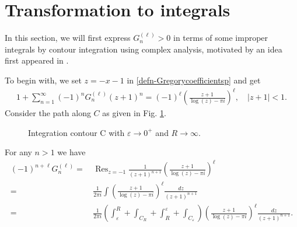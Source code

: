\documentclass[11pt]{article}
\newcommand\eps{{\varepsilon}}
\DeclareMathOperator{\Res}{Res}
\theoremstyle{plain}
\theoremstyle{definition}
\begin{document}
\section{Transformation to integrals}\label{sec:contour}
In this section, we will first express $G_n^{(\ell)}>0$ in terms of some improper integrals by contour integration using complex analysis, motivated by an idea first appeared in \cite{Schr1880}.

To begin with, we set $z=-x-1$ in \eqref{defn-Gregorycoefficientsp} and get
\begin{align*}
1+\sum_{n=1}^\infty (-1)^n G_n^{(\ell)}(z+1)^n=(-1)^\ell \left(\frac{z+1}{\log(z)-\pi i}\right)^\ell, \quad |z+1|<1.
\end{align*}
Consider the path along $C$ as given in Fig. \ref{fig:C}.
\begin{figure}[h]
\begin{center}
\end{center}
\caption{Integration contour C with $\eps\to 0^+$ and $R\to \infty$.}
\label{fig:C}
\end{figure}

For any $n>1$ we have
\begin{align*}
(-1)^{n+\ell} G_n^{(\ell)}= &\, \Res_{z=-1} \frac{1}{(z+1)^{n+1}} \left(\frac{z+1}{\log(z)-\pi i}\right)^\ell \\
=&\, \frac{1}{2\pi i} \int  \left(\frac{z+1}{\log(z)-\pi i}\right)^\ell \frac{dz}{(z+1)^{n+1}}\\
=&\, \frac{1}{2\pi i}\left( \int_\eps^R +\int_{C_R}+\int_R^\eps+ \int_{C_\eps} \right) \left(\frac{z+1}{\log(z)-\pi i}\right)^\ell \frac{dz}{(z+1)^{n+1}}.
\end{align*}
\end{document}
